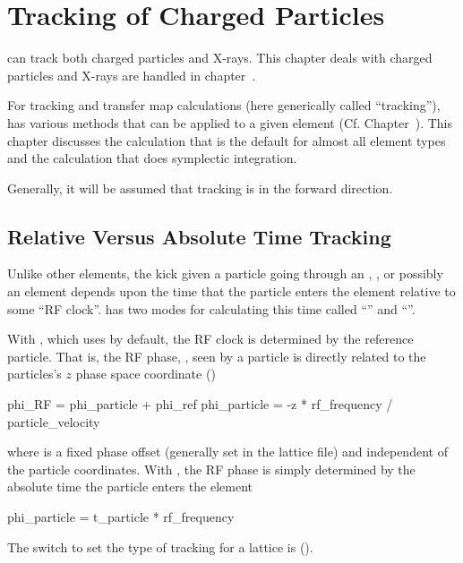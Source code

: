 \chapter{Tracking of Charged Particles}
\label{c:charged.track}

\bmad can track both charged particles and X-rays. This chapter deals
with charged particles and X-rays are handled in
chapter~.

For tracking and transfer map calculations (here generically called
``tracking''), \bmad has various methods that can be applied to a
given element (Cf. Chapter~). This chapter discusses
the  calculation that is the default for almost all
element types and the  calculation that does
symplectic integration.

Generally, it will be assumed that tracking is in the forward direction.

\section{Relative Versus Absolute Time Tracking}
\label{s:rf.time}

Unlike other elements, the kick given a particle going through an
, , or possibly an  element
depends upon the time that the particle enters the element relative to
some ``RF clock''. \bmad has two modes for calculating this time
called ``'' and ``''.

With , which \bmad uses by default, the RF
clock is determined by the reference particle. That is, the RF phase,
, seen by a particle is directly related to the particles's
$z$ phase space coordinate ()
\begin{example}
  phi_RF = phi_particle + phi_ref
  phi_particle = -z * rf_frequency / particle_velocity
\end{example}
where  is a fixed phase offset (generally set in the
lattice file) and independent of the particle coordinates. With
, the RF phase is simply determined by the
absolute time the particle enters the element
\begin{example}
  phi_particle = t_particle * rf_frequency
\end{example}
The switch to set the type of tracking for a lattice is
 ().

